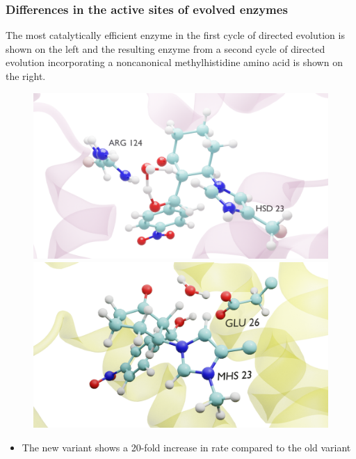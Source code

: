 \documentclass{beamer}
\begin{document}
\begin{frame}
\frametitle{Differences in the active sites of evolved enzymes}
The most catalytically efficient enzyme in the first cycle of 
directed evolution  is shown on the left and 
the resulting enzyme from a second cycle of directed evolution incorporating 
a noncanonical methylhistidine amino acid is shown on the right.
\begin{figure}[ht!]
\centering
\begin{minipage}[b]{0.45\linewidth}
\includegraphics[scale=0.08]{figures/trans-120.png}
\end{minipage}
\quad
\begin{minipage}[b]{0.45\linewidth}
\includegraphics[scale=0.08]{figures/prot-alkoxide-trans.png}
\end{minipage}
\end{figure}
\begin{itemize}
\item The new variant shows a 20-fold increase in rate compared to the old variant
\end{itemize}
\end{frame}
\end{document}
